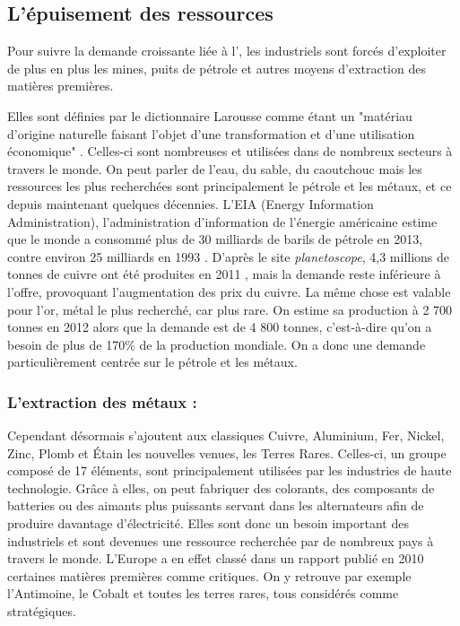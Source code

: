 \subsection{L’épuisement des ressources}

Pour suivre la demande croissante liée à l'\op, les industriels sont forcés d'exploiter de plus en plus les mines, puits de pétrole et autres moyens d'extraction des matières premières.

\bigbreak Elles sont définies par le dictionnaire Larousse comme étant un "matériau d'origine naturelle faisant l'objet d'une transformation et d'une utilisation économique" \cite{LarousseMatiere1eres}. Celles-ci sont nombreuses et utilisées dans de nombreux secteurs à travers le monde. On peut parler de l'eau, du sable, du caoutchouc mais les ressources les plus recherchées sont principalement le pétrole et les métaux, et ce depuis maintenant quelques décennies. L'EIA (Energy Information Administration), l'admi\-nistration d'information de l'énergie américaine estime que le monde a consommé plus de 30 milliards de barils de pétrole en 2013, contre environ 25 milliards en 1993 \cite{EAI}. D'après le site \textit{planetoscope}, 4,3 millions de tonnes de cuivre ont été produites en 2011 \cite{planetoscopeOrCuivre}, mais la demande reste inférieure à l'offre, provoquant l'augmentation des prix du cuivre. La même chose est valable pour l'or, métal le plus recherché, car plus rare. On estime sa production à 2 700 tonnes en 2012 alors que la demande est de 4 800 tonnes, c'est-à-dire qu'on a besoin de plus de 170\% de la production mondiale. On a donc une demande particulièrement centrée sur le pétrole et les métaux.


\subsubsection{L'extraction des métaux : }

Cependant désormais s'ajoutent aux classiques Cuivre, Aluminium, Fer, Nickel, Zinc, Plomb et Étain les nouvelles venues, les Terres Rares. Celles-ci, un groupe composé de 17 éléments, sont principalement utilisées par les industries de haute technologie. Grâce à elles, on peut fabriquer des colorants, des composants de batteries ou des aimants plus puissants servant dans les alternateurs afin de produire davantage d’électricité. Elles sont donc un besoin important des industriels et sont devenues une ressource recherchée par de nombreux pays à travers le monde. L'Europe a en effet classé dans un rapport publié en 2010 \cite{RapportEuropeenTerresRares} certaines matières premières comme critiques. On y retrouve par exemple l'Antimoine, le Cobalt et toutes les terres rares, tous considérés comme stratégiques.

